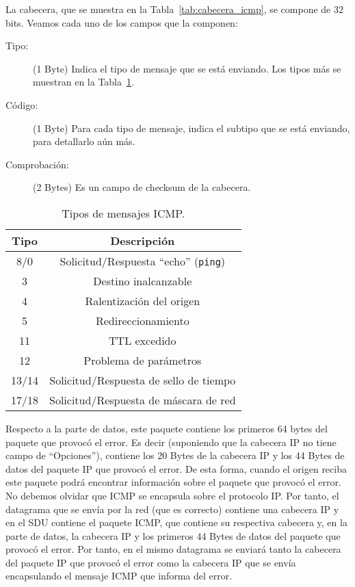 La cabecera, que se muestra en la Tabla~\ref{tab:cabecera_icmp}, se compone de $32$ bits. Veamos cada uno de los campos que la componen:
\begin{description}
    \item[Tipo:] (1 Byte) Indica el tipo de mensaje que se está enviando. Los tipos más se muestran en la Tabla~\ref{tab:tipos_icmp}.
    \item[Código:] (1 Byte) Para cada tipo de mensaje, indica el subtipo que se está enviando, para detallarlo aún más.
    \item[Comprobación:] (2 Bytes) Es un campo de checksum de la cabecera.
\end{description}
\begin{table}
\centering
    \begin{tabular}{|c|c|}
        \hline
        \textbf{Tipo} & \textbf{Descripción} \\ \hline
        8/0 & Solicitud/Respuesta ``echo'' (\verb|ping|) \\
        3 & Destino inalcanzable \\
        4 & Ralentización del origen \\
        5 & Redireccionamiento \\ 
        11 & \acrshort{TTL} excedido \\
        12 & Problema de parámetros \\
        13/14 & Solicitud/Respuesta de sello de tiempo\\
        17/18 & Solicitud/Respuesta de máscara de red\\ \hline
    \end{tabular}
    \caption{Tipos de mensajes \acrshort{ICMP}.}
    \label{tab:tipos_icmp}
\end{table}

Respecto a la parte de datos, este paquete contiene los primeros 64 bytes del paquete que provocó el error. Es decir (suponiendo que la cabecera \acrshort{IP} no tiene campo de ``Opciones''), contiene los 20 Bytes de la cabecera \acrshort{IP} y los 44 Bytes de datos del paquete \acrshort{IP} que provocó el error. De esta forma, cuando el origen reciba este paquete podrá encontrar información sobre el paquete que provocó el error.\\

No debemos olvidar que \acrshort{ICMP} se encapsula sobre el protocolo \acrshort{IP}. Por tanto, el datagrama que se envía por la red (que es correcto) contiene una cabecera \acrshort{IP} y en el \acrshort{SDU} contiene el paquete \acrshort{ICMP}, que contiene su respectiva cabecera y, en la parte de datos, la cabecera \acrshort{IP} y los primeros 44 Bytes de datos del paquete que provocó el error. Por tanto, en el mismo datagrama se enviará tanto la cabecera del paquete \acrshort{IP} que provocó el error como la cabecera \acrshort{IP} que se envía encapsulando el mensaje \acrshort{ICMP} que informa del error.\\

